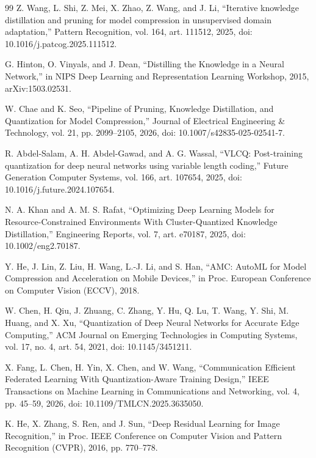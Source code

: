 \documentclass[oneside,a4paper,12pt]{report}
\begin{document}
\renewcommand{\bibname}{References}
\begin{thebibliography}{99}
 Z. Wang, L. Shi, Z. Mei, X. Zhao, Z. Wang, and J. Li, ``Iterative knowledge distillation and pruning for model compression in unsupervised domain adaptation,'' Pattern Recognition, vol. 164, art. 111512, 2025, doi: 10.1016/j.patcog.2025.111512.

 G. Hinton, O. Vinyals, and J. Dean, ``Distilling the Knowledge in a Neural Network,'' in NIPS Deep Learning and Representation Learning Workshop, 2015, arXiv:1503.02531.

 W. Chae and K. Seo, ``Pipeline of Pruning, Knowledge Distillation, and Quantization for Model Compression,'' Journal of Electrical Engineering \& Technology, vol. 21, pp. 2099–2105, 2026, doi: 10.1007/s42835-025-02541-7.

 R. Abdel-Salam, A. H. Abdel-Gawad, and A. G. Wassal, ``VLCQ: Post-training quantization for deep neural networks using variable length coding,'' Future Generation Computer Systems, vol. 166, art. 107654, 2025, doi: 10.1016/j.future.2024.107654.

 N. A. Khan and A. M. S. Rafat, ``Optimizing Deep Learning Models for Resource-Constrained Environments With Cluster-Quantized Knowledge Distillation,'' Engineering Reports, vol. 7, art. e70187, 2025, doi: 10.1002/eng2.70187.

 Y. He, J. Lin, Z. Liu, H. Wang, L.-J. Li, and S. Han, ``AMC: AutoML for Model Compression and Acceleration on Mobile Devices,'' in Proc. European Conference on Computer Vision (ECCV), 2018.

 W. Chen, H. Qiu, J. Zhuang, C. Zhang, Y. Hu, Q. Lu, T. Wang, Y. Shi, M. Huang, and X. Xu, ``Quantization of Deep Neural Networks for Accurate Edge Computing,'' ACM Journal on Emerging Technologies in Computing Systems, vol. 17, no. 4, art. 54, 2021, doi: 10.1145/3451211.

 X. Fang, L. Chen, H. Yin, X. Chen, and W. Wang, ``Communication Efficient Federated Learning With Quantization-Aware Training Design,'' IEEE Transactions on Machine Learning in Communications and Networking, vol. 4, pp. 45–59, 2026, doi: 10.1109/TMLCN.2025.3635050.

 K. He, X. Zhang, S. Ren, and J. Sun, ``Deep Residual Learning for Image Recognition,'' in Proc. IEEE Conference on Computer Vision and Pattern Recognition (CVPR), 2016, pp. 770--778.


\end{thebibliography}
\end{document}
